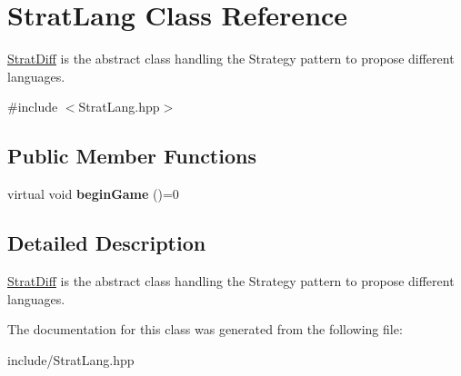 \hypertarget{classStratLang}{\section{\-Strat\-Lang \-Class \-Reference}
\label{classStratLang}
}


\hyperlink{classStratDiff}{\-Strat\-Diff} is the abstract class handling the \-Strategy pattern to propose different languages.  




{\ttfamily \#include $<$\-Strat\-Lang.\-hpp$>$}

\subsection*{\-Public \-Member \-Functions}
\begin{DoxyCompactItemize}
\item 
\hypertarget{classStratLang_aa7a231de0ae7c735b16ae06d898e1141}{virtual void {\bfseries begin\-Game} ()=0}\label{classStratLang_aa7a231de0ae7c735b16ae06d898e1141}

\end{DoxyCompactItemize}


\subsection{\-Detailed \-Description}
\hyperlink{classStratDiff}{\-Strat\-Diff} is the abstract class handling the \-Strategy pattern to propose different languages. 

\-The documentation for this class was generated from the following file\-:\begin{DoxyCompactItemize}
\item 
include/\-Strat\-Lang.\-hpp\end{DoxyCompactItemize}
